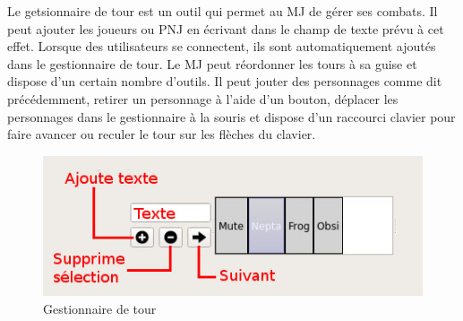 Le getsionnaire de tour est un outil qui permet au MJ de gérer ses combats. Il peut ajouter les joueurs ou PNJ en écrivant dans le champ de texte prévu à cet effet. Lorsque des utilisateurs se connectent, ils sont automatiquement ajoutés dans le gestionnaire de tour. Le MJ peut réordonner les tours à sa guise et dispose d'un certain nombre d'outils. Il peut jouter des personnages comme dit précédemment, retirer un personnage à l'aide d'un bouton, déplacer les personnages dans le gestionnaire à la souris et dispose d'un raccourci clavier pour faire avancer ou reculer le tour sur les flèches du clavier.

\begin{figure}[h!]
	\centering
	\includegraphics[scale=0.7]{img/turn_manager.jpg}
	\caption{Gestionnaire de tour}
\end{figure}